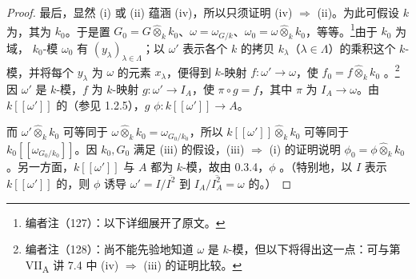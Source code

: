 \begin{proof}
最后，显然 (i) 或 (ii) 蕴涵 (iv)，所以只须证明 (iv) $\Rightarrow$ (ii)。为此可假设 $k$ 为，其为
$k_0$。于是置 $G_0=G\widehat\otimes_k k_0$、$\omega=\omega_{G/k}$、$\omega_0=\omega\widehat\otimes_k k_0$，等等。\footnote{编者注（127）：以下详细展开了原文。}由于 $k_0$ 为域， $k_0$-模 $\omega_0$ 有 $(y_\lambda)_{\lambda\in\Lambda}$；以 $\omega'$ 表示各个 $k$ 的拷贝 $k_\lambda$（$\lambda\in\Lambda$）的乘积这个 $k$-模，并将每个 $y_\lambda$ 为 $\omega$ 的元素 $x_\lambda$，便得到 $k$-映射 $f:\omega'\to\omega$，使 $f_0=f\widehat\otimes_k k_0$ 。\footnote{编者注（128）：尚不能先验地知道 $\omega$ 是 $k$-模，但以下将得出这一点：可与第 VII\textsubscript{A} 讲 7.4 中 (iv) $\Rightarrow$ (iii) 的证明比较。}因 $\omega'$ 是 $k$-模，$f$ 为 $k$-映射 $g:\omega'\to I_A$，使 $\pi\circ g=f$，其中 $\pi$ 为 $I_A\to\omega$。由 $k[[\omega']]$ 的（参见 1.2.5），$g$  $\phi:k[[\omega']]\to A$。

而 $\omega'\widehat\otimes_k k_0$ 可等同于 $\omega\widehat\otimes_k k_0=\omega_{G_0/k_0}$，所以 $k[[\omega']]\widehat\otimes_k k_0$ 可等同于 $k_0[[\omega_{G_0/k_0}]]$。因 $k_0,G_0$ 满足 (iii) 的假设，(iii) $\Rightarrow$ (i) 的证明说明 $\phi_0=\phi\widehat\otimes_k k_0$ 。另一方面，$k[[\omega']]$ 与 $A$ 都为 $k$-模，故由 0.3.4，$\phi$ 。（特别地，以 $I$ 表示 $k[[\omega']]$ 的，则 $\phi$ 诱导 $\omega'=I/\overline{I^2}$ 到 $I_A/\overline{I_A^2}=\omega$ 的。）
\end{proof}

